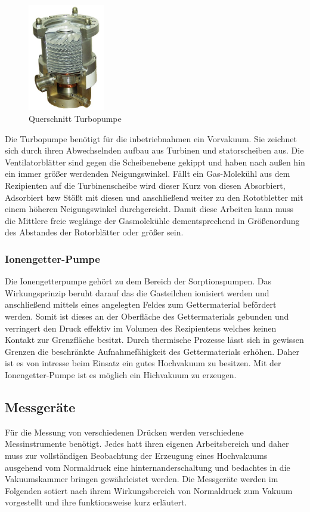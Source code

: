 \begin{figure}
    \vspace{-1cm}
    \centering
    \includegraphics[width=0.3\textwidth]{./picture/Turbo.jpg}
    \caption{Querschnitt Turbopumpe \cite{??}}
    \label{fig:Turbo}
    \vspace{-1cm}
\end{figure}
Die Turbopumpe benötigt für die inbetriebnahmen ein Vorvakuum. Sie zeichnet sich durch ihren Abwechselnden aufbau aus Turbinen und statorscheiben aus. Die Ventilatorblätter sind gegen die Scheibenebene gekippt und haben nach außen hin ein immer größer werdenden Neigungswinkel. Fällt ein Gas-Molekühl aus dem Rezipienten auf die Turbinenscheibe wird dieser Kurz von diesen Absorbiert, Adsorbiert bzw Stößt mit diesen und anschließend weiter zu den Rototbletter mit einem höheren Neigungswinkel durchgereicht. Damit diese Arbeiten kann muss die Mittlere freie weglänge der Gasmolekühle dementsprechend in Größenordung des Abstandes der Rotorblätter oder größer sein.


\subsubsection{Ionengetter-Pumpe}
Die Ionengetterpumpe gehört zu dem Bereich der Sorptionspumpen. Das Wirkungsprinzip beruht darauf das die Gasteilchen ionisiert werden und anschließend mittels eines angelegten Feldes zum Gettermaterial befördert werden. Somit ist dieses an der Oberfläche des Gettermaterials gebunden und verringert den Druck effektiv im Volumen des Rezipientens welches keinen Kontakt zur Grenzfläche besitzt. Durch thermische Prozesse lässt sich in gewissen Grenzen die beschränkte Aufnahmefähigkeit des Gettermaterials erhöhen. Daher ist es von intresse beim Einsatz ein gutes Hochvakuum zu besitzen. Mit der Ionengetter-Pumpe ist es möglich ein Hichvakuum zu erzeugen.

\subsection{Messgeräte}
Für die Messung von verschiedenen Drücken werden verschiedene Messinstrumente benötigt. Jedes hatt ihren eigenen Arbeitsbereich und daher muss zur vollständigen Beobachtung der Erzeugung eines Hochvakuums ausgehend vom Normaldruck eine hinternanderschaltung und bedachtes in die Vakuumskammer bringen gewährleistet werden. Die Messgeräte werden im Folgenden sotiert nach ihrem Wirkungsbereich von Normaldruck zum Vakuum vorgestellt und ihre funktionsweise kurz erläutert.

